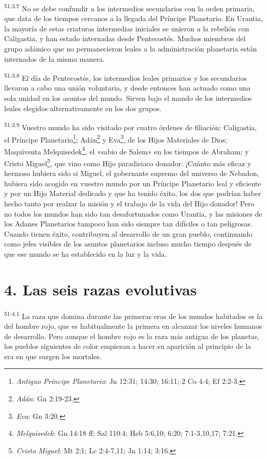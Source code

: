 \par
\textsuperscript{51:3.7} No se debe confundir a los intermedios secundarios con la orden primaria, que data de los tiempos cercanos a la llegada del Príncipe Planetario. En Urantia, la mayoría de estas criaturas intermedias iniciales se unieron a la rebelión con Caligastia, y han estado internadas desde Pentecostés. Muchos miembros del grupo adámico que no permanecieron leales a la administración planetaria están internados de la misma manera.

\par
\textsuperscript{51:3.8} El día de Pentecostés, los intermedios leales primarios y los secundarios llevaron a cabo una unión voluntaria, y desde entonces han actuado como una sola unidad en los asuntos del mundo. Sirven bajo el mando de los intermedios leales elegidos alternativamente en los dos grupos.

\par
\textsuperscript{51:3.9} Vuestro mundo ha sido visitado por cuatro órdenes de filiación: Caligastia, el Príncipe Planetario\footnote{\textit{Antiguo Príncipe Planetario}: Jn 12:31; 14:30; 16:11; 2 Co 4:4; Ef 2:2-3.}; Adán\footnote{\textit{Adán}: Gn 2:19-23.} y Eva\footnote{\textit{Eva}: Gn 3:20.}, de los Hijos Materiales de Dios; Maquiventa Melquisedek\footnote{\textit{Melquisedek}: Gn 14:18 ff; Sal 110:4; Heb 5:6,10; 6:20; 7:1-3,10,17; 7:21.}, el «sabio de Salem» en los tiempos de Abraham; y Cristo Miguel\footnote{\textit{Cristo Miguel}: Mt 2:1; Lc 2:4-7,11; Jn 1:14; 3:16.}, que vino como Hijo paradisiaco donador. ¡Cuánto más eficaz y hermoso hubiera sido si Miguel, el gobernante supremo del universo de Nebadon, hubiera sido acogido en vuestro mundo por un Príncipe Planetario leal y eficiente y por un Hijo Material dedicado y que ha tenido éxito, los dos que podrían haber hecho tanto por realzar la misión y el trabajo de la vida del Hijo donador! Pero no todos los mundos han sido tan desafortunados como Urantia, y las misiones de los Adanes Planetarios tampoco han sido siempre tan difíciles o tan peligrosas. Cuando tienen éxito, contribuyen al desarrollo de un gran pueblo, continuando como jefes visibles de los asuntos planetarios incluso mucho tiempo después de que ese mundo se ha establecido en la luz y la vida.

\section*{4. Las seis razas evolutivas}
\par
\textsuperscript{51:4.1} La raza que domina durante las primeras eras de los mundos habitados es la del hombre rojo, que es habitualmente la primera en alcanzar los niveles humanos de desarrollo. Pero aunque el hombre rojo es la raza más antigua de los planetas, los pueblos siguientes de color empiezan a hacer su aparición al principio de la era en que surgen los mortales.

